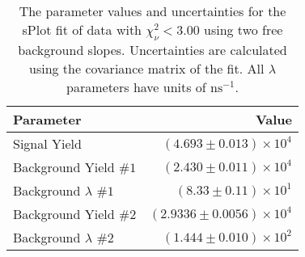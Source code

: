 
\begin{table}[h]
    \begin{center}
        \begin{tabular}{lr}\toprule
            Parameter & Value \\\midrule
            Signal Yield & $(4.693 \pm 0.013) \times 10^{4}$ \\
            Background Yield $\#1$ & $(2.430 \pm 0.011) \times 10^{4}$ \\
            Background $\lambda$ $\#1$ & $(8.33 \pm 0.11) \times 10^{1}$ \\
            Background Yield $\#2$ & $(2.9336 \pm 0.0056) \times 10^{4}$ \\
            Background $\lambda$ $\#2$ & $(1.444 \pm 0.010) \times 10^{2}$ \\\bottomrule
        \end{tabular}
        \caption{The parameter values and uncertainties for the sPlot fit of data with $\chi^2_\nu < 3.00$ using two free background slopes. Uncertainties are calculated using the covariance matrix of the fit. All $\lambda$ parameters have units of $\si{\nano\second}^{-1}$.}
    \end{center}
\end{table}
